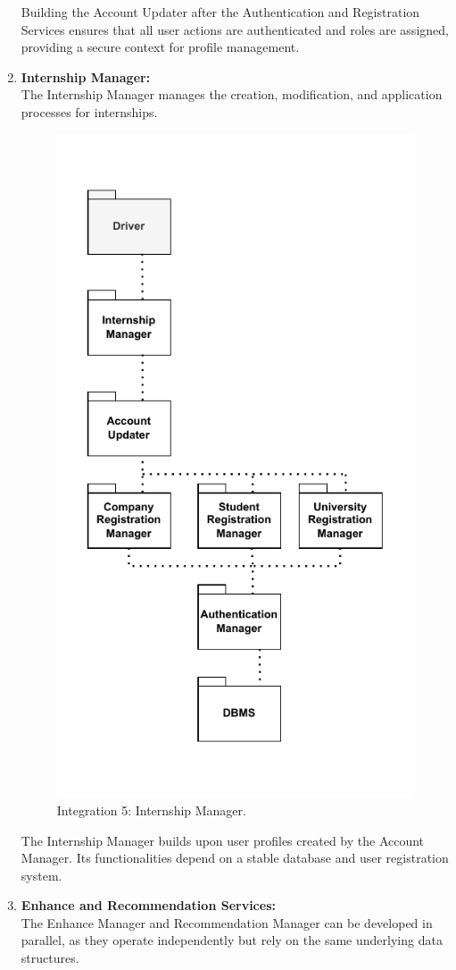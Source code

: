 \begin{enumerate}
Building the Account Updater after the Authentication and Registration Services ensures that all user actions are authenticated and roles are assigned, providing a secure context for profile management.
\newpage
    \item 
\textbf{Internship Manager:} \\
The Internship Manager manages the creation, modification, and application processes for internships.

\begin{figure}[H]
    \centering
    \includegraphics[width=0.5\linewidth]{DD/Images/Testing/5_Internship.drawio.pdf}
    \caption{Integration 5: Internship Manager.}
    \label{fig:integration_5}
\end{figure}

The Internship Manager builds upon user profiles created by the Account Manager. Its functionalities depend on a stable database and user registration system.
\newpage
    \item 
\textbf{Enhance and Recommendation Services:} \\
The Enhance Manager and Recommendation Manager can be developed in parallel, as they operate independently but rely on the same underlying data structures.


\end{enumerate}
